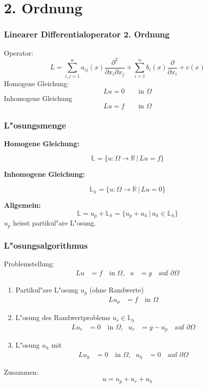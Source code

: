 
\section{2. Ordnung}

\begin{frame}
\frametitle{Linearer Differentialoperator 2. Ordnung}
Operator:
\[
L
=
\sum_{i,j=1}^n a_{ij}(x)\frac{\partial^2}{\partial x_i\partial x_j}
+
\sum_{i=1}^n b_i(x)\frac{\partial}{\partial x_i}
+
c(x)
\]
Homogene Gleichung:
\[
Lu=0\qquad\text{in $\Omega$}
\]
Inhomogene Gleichung
\[
Lu=f\qquad\text{in $\Omega$}
\]
\end{frame}

\begin{frame}
\frametitle{L"osungsmenge}
{\bf Homogene Gleichung:}

\[
{\mathbb L}
=\{
u\colon \Omega\to \mathbb R\,|\, Lu=f
\}
\]

\bigskip

{\bf Inhomogene Gleichung:}

\[
{\mathbb L}_h
=\{
u\colon \Omega\to \mathbb R\,|\, Lu=0
\}
\]

{\bf Allgemein:}
\[
{\mathbb L} = u_p + {\mathbb L}_h
=\{u_p+u_h\,|\,u_h\in\mathbb L_h\}
\]
$u_p$ heisst partikul"are L"osung.

\end{frame}

\begin{frame}
\frametitle{L"osungsalgorithmus}
Problemstellung:
\begin{align*}
Lu&=f\quad\text{in $\Omega$,}
&
 u&=g\quad\text{auf $\partial\Omega$}
\end{align*}

\begin{enumerate}
\item Partikul"are L"osung $u_p$ (ohne Randwerte)
\begin{align*}
Lu_p&=f\quad\text{in $\Omega$}
\end{align*}
\item
L"osung des Randwertproblems $u_r\in\mathbb L_h$
\begin{align*}
Lu_r&=0    \quad\text{in $\Omega$,}&
 u_r&=g-u_p\quad\text{auf $\partial\Omega$}
\end{align*}
\item
L"osung $u_h$ mit
\begin{align*}
Lu_h&=0\quad\text{in $\Omega$,}
&
 u_h&=0\quad\text{auf $\partial\Omega$}
\end{align*}
\end{enumerate}
Zusammen:
\[
u = u_p+u_r+u_h
\]
\end{frame}

